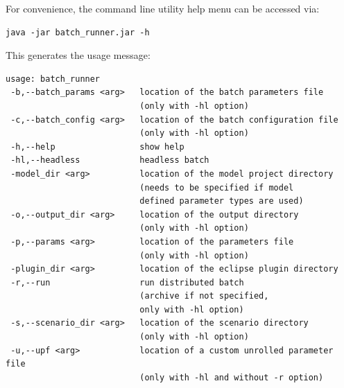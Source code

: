 \documentclass[11pt]{amsart}
\begin{document}
For convenience, the command line utility help menu can be accessed via:
\begin{verbatim}
java -jar batch_runner.jar -h
\end{verbatim}
\noindent This generates the usage message:
\begin{verbatim}
usage: batch_runner
 -b,--batch_params <arg>   location of the batch parameters file
                           (only with -hl option)
 -c,--batch_config <arg>   location of the batch configuration file
                           (only with -hl option)
 -h,--help                 show help
 -hl,--headless            headless batch
 -model_dir <arg>          location of the model project directory
                           (needs to be specified if model
                           defined parameter types are used)
 -o,--output_dir <arg>     location of the output directory
                           (only with -hl option)
 -p,--params <arg>         location of the parameters file
                           (only with -hl option)
 -plugin_dir <arg>         location of the eclipse plugin directory
 -r,--run                  run distributed batch
                           (archive if not specified,
                           only with -hl option)
 -s,--scenario_dir <arg>   location of the scenario directory
                           (only with -hl option)
 -u,--upf <arg>            location of a custom unrolled parameter file
                           (only with -hl and without -r option)
\end{verbatim}
\end{document}
